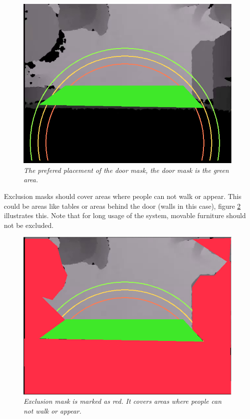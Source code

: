 \begin{figure}[H]
	\centering
	\includegraphics[width=\linewidth]{images/Manual3.png}
	\caption[Exclusion mask]{\textit{The prefered placement of the door mask, the door mask is the green area.}}
	\label{fig:doorMask}  %
\end{figure}

\newpage
Exclusion masks should cover areas where people can not walk or appear. This could be areas like tables or areas behind the door (walls in this case), figure \ref{fig:exMask} illustrates this. Note that for long usage of the system, movable furniture should not be excluded.

\begin{figure}[H]
	\centering
	\includegraphics[width=\linewidth]{images/Manual1.png}
	\caption[Exclusion mask]{\textit{Exclusion mask is marked as red. It covers areas where people can not walk or appear.}}
	\label{fig:exMask}  %
\end{figure}